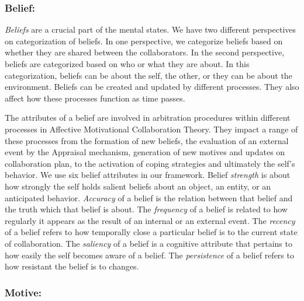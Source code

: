 \documentclass{aamas2016}
\begin{document}
\subsubsection{Belief:}

\textit{Beliefs} are a crucial part of the mental states. We have two different
perspectives on categorization of beliefs. In one perspective, we categorize
beliefs based on whether they are shared between the collaborators. In the
second perspective, beliefs are categorized based on who or what they are about.
In this categorization, beliefs can be about the self, the other, or they can be
about the environment. Beliefs can be created and updated by different
processes. They also affect how these processes function as time passes.

The attributes of a belief are involved in arbitration procedures within
different processes in Affective Motivational Collaboration Theory. They impact
a range of these processes from the formation of new beliefs, the evaluation of
an external event by the Appraisal mechanism, generation of new motives and
updates on collaboration plan, to the activation of coping strategies and
ultimately the self's behavior. We use six belief attributes in our framework.
Belief \textit{strength} is about how strongly the self holds salient beliefs
about an object, an entity, or an anticipated behavior. \textit{Accuracy} of a
belief is the relation between that belief and the truth which that belief is
about. The \textit{frequency} of a belief is related to how regularly it appears
as the result of an internal or an external event. The \textit{recency} of a
belief refers to how temporally close a particular belief is to the current
state of collaboration. The \textit{saliency} of a belief is a cognitive
attribute that pertains to how easily the self becomes aware of a belief. The
\textit{persistence} of a belief refers to how resistant the belief is to
changes.

\subsubsection{Motive:}
\end{document}
